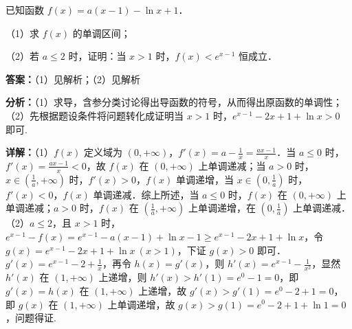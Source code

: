 \begin{question}[points=12]
已知函数 $f(x) = a(x-1) - \ln x + 1$．

（1）求 $f(x)$ 的单调区间；

（2）若 $a \le 2$ 时，证明：当 $x > 1$ 时，$f(x) < e^{x-1}$ 恒成立．
\begin{solution}
\textbf{答案：}（1）见解析；（2）见解析

\textbf{分析：}（1）求导，含参分类讨论得出导函数的符号，从而得出原函数的单调性；（2）先根据题设条件将问题转化成证明当 $x > 1$ 时，$e^{x-1} - 2x + 1 + \ln x > 0$ 即可.

\textbf{详解：}（1）$f(x)$ 定义域为 $(0, +\infty)$，$f'(x) = a - \frac{1}{x} = \frac{ax - 1}{x}$．当 $a \le 0$ 时，$f'(x) = \frac{ax - 1}{x} < 0$，故 $f(x)$ 在 $(0, +\infty)$ 上单调递减；当 $a > 0$ 时，$x \in \left(\frac{1}{a}, +\infty\right)$ 时，$f'(x) > 0$，$f(x)$ 单调递增，当 $x \in \left(0, \frac{1}{a}\right)$ 时，$f'(x) < 0$，$f(x)$ 单调递减．综上所述，当 $a \le 0$ 时，$f(x)$ 在 $(0, +\infty)$ 上单调递减；$a > 0$ 时，$f(x)$ 在 $\left(\frac{1}{a}, +\infty\right)$ 上单调递增，在 $\left(0, \frac{1}{a}\right)$ 上单调递减．
（2）$a \le 2$，且 $x > 1$ 时，$e^{x-1} - f(x) = e^{x-1} - a(x-1) + \ln x - 1 \ge e^{x-1} - 2x + 1 + \ln x$，令 $g(x) = e^{x-1} - 2x + 1 + \ln x \ (x > 1)$，下证 $g(x) > 0$ 即可．$g'(x) = e^{x-1} - 2 + \frac{1}{x}$，再令 $h(x) = g'(x)$，则 $h'(x) = e^{x-1} - \frac{1}{x^2}$，显然 $h'(x)$ 在 $(1, +\infty)$ 上递增，则 $h'(x) > h'(1) = e^0 - 1 = 0$，即 $g'(x) = h(x)$ 在 $(1, +\infty)$ 上递增，故 $g'(x) > g'(1) = e^0 - 2 + 1 = 0$，即 $g(x)$ 在 $(1, +\infty)$ 上单调递增，故 $g(x) > g(1) = e^0 - 2 + 1 + \ln 1 = 0$，问题得证.
\end{solution}
\end{question}

